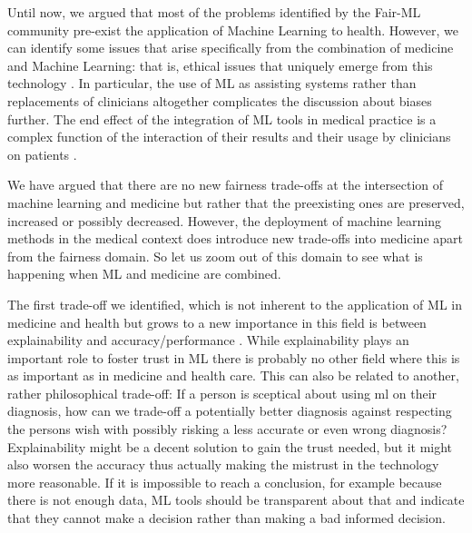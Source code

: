     Until now, we argued that most of the problems identified by the Fair-ML community pre-exist the application of Machine Learning to health.
    However, we can identify some issues that arise specifically from the combination of medicine and Machine Learning: that is, ethical issues that uniquely emerge from this technology \cite{Dijkstra2020}.
    In particular, the use of ML as assisting systems rather than replacements of clinicians altogether complicates the discussion about biases further.
    The end effect of the integration of ML tools in medical practice is a complex function of the interaction of their results and their usage by clinicians on patients \cite[p.~4]{Rajkomar2018}.


We have argued that there are no new fairness trade-offs at the intersection of machine learning and medicine but rather that the preexisting ones are preserved, increased or possibly decreased. However, the deployment of machine learning methods in the medical context does introduce new trade-offs into medicine apart from the fairness domain. So let us zoom out of this domain to see what is happening when ML and medicine are combined. 

The first trade-off we identified, which is not inherent to the application of ML in medicine and health but grows to a new importance in this field is between explainability and accuracy/performance \cite{topol2019high, kelly2019key} . While explainability plays an important role to foster trust in ML there is probably no other field where this is as important as in medicine and health care. This can also be related to another, rather philosophical trade-off: If a person is sceptical about using ml on their diagnosis, how can we trade-off a potentially better diagnosis against respecting the persons wish with possibly risking a less accurate or even wrong diagnosis? Explainability might be a decent solution to gain the trust needed, but it might also worsen the accuracy thus actually making the mistrust in the technology more reasonable.
If it is impossible to reach a conclusion, for example because there is not enough data, ML tools should be transparent about that and indicate that they cannot make a decision rather than making a bad informed decision.  \cite{horgan2019artificial}


